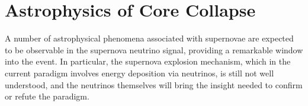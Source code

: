 


\section{Astrophysics of Core Collapse}
\label{sec:physics-snblowe-astrophysics}


A number of astrophysical phenomena associated with supernovae are expected to be observable
in the supernova neutrino signal, providing a remarkable window into the event.  In particular, the supernova explosion mechanism, which in the current paradigm involves energy deposition via neutrinos, is still not well understood, and the neutrinos themselves will bring the insight needed to confirm or refute the paradigm.

